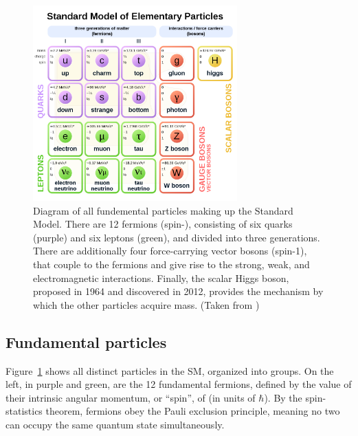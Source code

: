 \begin{figure}[ht]
  \begin{center}
    \includegraphics[width=0.70\textwidth]{figs/theory/standard_model.png}
    \caption{Diagram of all fundemental particles making up the Standard Model. There are 12 fermions (spin-), 
      consisting of six quarks (purple) and six leptons (green), 
      and divided into three generations. There are additionally four force-carrying vector bosons (spin-1),
      that couple to the fermions and give rise to the strong, weak, and electromagnetic interactions.
      Finally, the scalar Higgs boson, proposed in 1964 and discovered in 2012, provides the mechanism
      by which the other particles acquire mass. (Taken from \cite{SM_diagram})
            }
    \label{fig:sm}
  \end{center}
\end{figure}

\subsection{Fundamental particles}

Figure~\ref{fig:sm} shows all distinct particles in the SM, organized into groups.
On the left, in purple and green, are the 12 fundamental fermions, defined by the
value of their intrinsic angular momentum, or ``spin'', of  (in units
of $\hbar$). By the spin-statistics theorem, fermions obey the Pauli exclusion principle,
meaning no two can occupy the same quantum state simultaneously.

